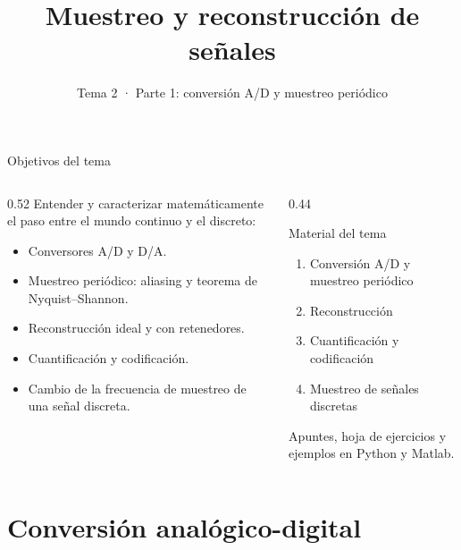 \documentclass[aspectratio=169,11pt]{beamer}
\title[T2 · Muestreo]{Muestreo y reconstrucción de señales}
\subtitle{Tema 2 · Parte 1: conversión A/D y muestreo periódico}
\begin{document}
\portada

\begin{frame}{Objetivos del tema}
  \begin{columns}[T]
    \begin{column}{0.52\textwidth}
      Entender y caracterizar matemáticamente el paso entre el mundo continuo y el discreto:
      \begin{itemize}
        \item Conversores A/D y D/A.
        \item Muestreo periódico: \alert{aliasing} y teorema de Nyquist–Shannon.
        \item Reconstrucción ideal y con retenedores.
        \item Cuantificación y codificación.
        \item Cambio de la frecuencia de muestreo de una señal discreta.
      \end{itemize}
    \end{column}
    \begin{column}{0.44\textwidth}
      \begin{block}{Material del tema}
        \small
        \begin{enumerate}
          \item Conversión A/D y muestreo periódico
          \item Reconstrucción
          \item Cuantificación y codificación
          \item Muestreo de señales discretas
        \end{enumerate}
        \smallskip
        Apuntes, hoja de ejercicios y ejemplos en Python y Matlab.
      \end{block}
    \end{column}
  \end{columns}
\end{frame}

\section{Conversión analógico-digital}
\end{document}
